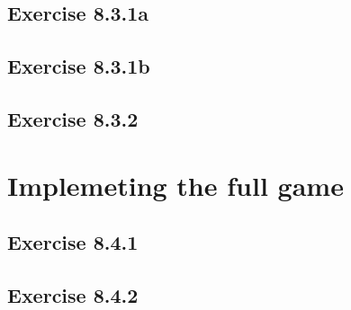 \documentclass[conference]{IEEEtran}
\begin{document}
		\subsection*{Exercise 8.3.1a}
		\subsection*{Exercise 8.3.1b}
		\subsection*{Exercise 8.3.2}
	\section{Implemeting the full game}
		\subsection*{Exercise 8.4.1}
		\subsection*{Exercise 8.4.2}
\end{document}
